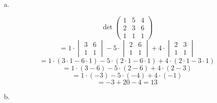 \documentclass[12pt]{article}
\begin{document}
\noindent a.

\begin{center}

$$ \det\begin{pmatrix} 1 & 5 & 4 \\ 2 & 3 & 6 \\ 1 & 1 & 1 \end{pmatrix} $$
$$
= 1 \cdot \begin{vmatrix} 3 & 6 \\ 1 & 1 \end{vmatrix}
- 5 \cdot \begin{vmatrix} 2 & 6 \\ 1 & 1 \end{vmatrix}
+ 4 \cdot \begin{vmatrix} 2 & 3 \\ 1 & 1 \end{vmatrix}
$$
$$ = 1 \cdot (3\cdot1 - 6\cdot1) - 5 \cdot (2\cdot1 - 6\cdot1) + 4 \cdot (2\cdot1 - 3\cdot1) $$
$$ = 1 \cdot (3 - 6) - 5 \cdot (2 - 6) + 4 \cdot (2 - 3) $$
$$ = 1 \cdot (-3) - 5 \cdot (-4) + 4 \cdot (-1) $$
$$ = -3 + 20 - 4 = 13 $$

\end{center}

\noindent b.
\end{document}
